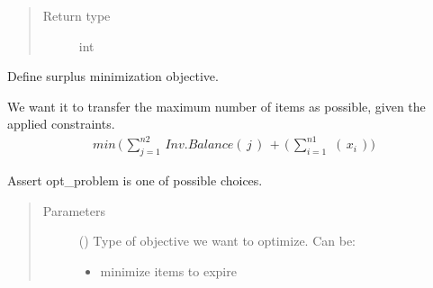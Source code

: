 \documentclass[letterpaper,10pt,english]{sphinxmanual}
\begin{document}
\begin{fulllineitems}
\begin{fulllineitems}
\begin{quote}
\begin{description}
\item[{Return type}] \leavevmode
int

\end{description}\end{quote}

\end{fulllineitems}


\begin{fulllineitems}
\label{\detokenize{source/optimization.model:optimization.model.optimizer.ObjectiveFunction._surplus_objective}}
Define surplus minimization objective.

We want it to transfer the maximum number of items as possible, given the applied constraints.
\begin{equation*}
\begin{split}min\,\bigg ( \,\sum_{j=1}^{n2}\,Inv. Balance(\,j\,)\,+\,(\,\sum_{i=1}^{n1}\,\,  (\,x_i\,) \bigg )\end{split}
\end{equation*}
\end{fulllineitems}


\begin{fulllineitems}
\label{\detokenize{source/optimization.model:optimization.model.optimizer.ObjectiveFunction._validate}}
Assert opt\_problem is one of possible choices.
\begin{quote}\begin{description}
\item[{Parameters}] \leavevmode
{} () \textendash{} 
Type of objective we want to optimize. Can be:
\begin{itemize}
\item {} 
 minimize items to expire


\end{itemize}
\end{description}
\end{quote}
\end{fulllineitems}
\end{fulllineitems}
\end{document}
